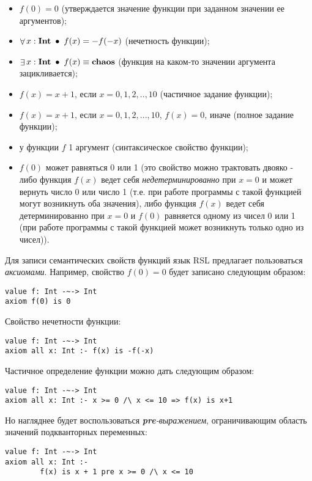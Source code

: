 \documentclass[14pt, twoside]{extreport}
\begin{document}
\begin{itemize}
  \item $f(0) = 0$ (утверждается значение функции при заданном значении ее аргументов);
  \item $\mathop{\forall} x: \textbf{Int} ~\mathop{\bullet}~ f(x) = -f(-x)$ (нечетность функции);
  \item $\mathop{\exists} x: \textbf{Int} ~\mathop{\bullet}~ f(x) \equiv \textbf{chaos}$ (функция на каком-то значении аргумента зацикливается);
  \item $f(x) = x + 1$, если $x = 0, 1, 2, .., 10$ (частичное задание функции);
  \item $f(x) = x + 1$, если $x = 0, 1, 2, ..., 10$, $f(x) = 0$, иначе (полное задание функции);
  \item у функции $f$ 1 аргумент (синтаксическое свойство функции);
  \item $f(0)$ может равняться 0 или 1 (это свойство можно трактовать двояко - либо функция $f(x)$ ведет себя \emph{недетерминированно} при $x = 0$ и может вернуть число 0 или число 1 (т.е. при работе программы с такой функцией могут возникнуть оба значения), либо функция $f(x)$ ведет себя детерминированно при $x = 0$ и $f(0)$ равняется одному из чисел 0 или 1 (при работе программы с такой функцией может возникнуть только одно из чисел)).
\end{itemize}

Для записи семантических свойств функций язык RSL предлагает пользоваться \emph{аксиомами}. Например, свойство $f(0) = 0$ будет записано следующим образом:

\begin{lstlisting}
value f: Int -~-> Int
axiom f(0) is 0
\end{lstlisting}

Свойство нечетности функции:
\begin{lstlisting}
value f: Int -~-> Int
axiom all x: Int :- f(x) is -f(-x)
\end{lstlisting}

Частичное определение функции можно дать следующим образом:
\begin{lstlisting}
value f: Int -~-> Int
axiom all x: Int :- x >= 0 /\ x <= 10 => f(x) is x+1
\end{lstlisting}

Но нагляднее будет воспользоваться \emph{\textbf{pre}-выражением}, ограничивающим область значений подкванторных переменных:
\begin{lstlisting}
value f: Int -~-> Int
axiom all x: Int :-
        f(x) is x + 1 pre x >= 0 /\ x <= 10
\end{lstlisting}
\end{document}
